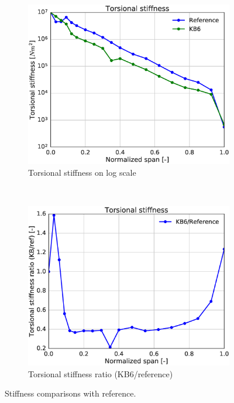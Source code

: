 \begin{figure}[tph]
\begin{subfigure}{0.50\textwidth}
\includegraphics[width=\linewidth]{figures/KB6_final/KB6_torsStiff_log.eps}
\caption{Torsional stiffness on log scale}
\label{subfig:KB6_torsstiff_log}
\end{subfigure}
 ~
\begin{subfigure}{0.50\textwidth}
\includegraphics[width=\linewidth]{figures/KB6_final/KB6_torsStiff_ratio.eps}
\caption{Torsional stiffness ratio (KB6/reference)}
\label{subfig:KB6_torsstiff_ratio}
\end{subfigure}

\caption{ Stiffness comparisons with reference.}
\label{fig:KB6_stiffness}
\end{figure}


